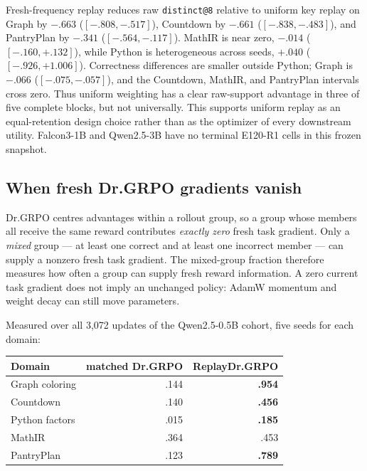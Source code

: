 Fresh-frequency replay reduces raw \texttt{distinct@8} relative to uniform key
replay on Graph by \(-.663\) (\([-.808,-.517]\)), Countdown by \(-.661\)
(\([-.838,-.483]\)), and PantryPlan by \(-.341\)
(\([-.564,-.117]\)). MathIR is near zero, \(-.014\)
(\([-.160,+.132]\)), while Python is heterogeneous across seeds, \(+.040\)
(\([-.926,+1.006]\)). Correctness differences are smaller outside Python;
Graph is \(-.066\) (\([-.075,-.057]\)), and the Countdown, MathIR, and
PantryPlan intervals cross zero. Thus uniform weighting has a clear raw-support
advantage in three of five complete blocks, but not universally. This supports
uniform replay as an equal-retention design choice rather than as the optimizer
of every downstream utility. Falcon3-1B and Qwen2.5-3B have no terminal E120-R1
cells in this frozen snapshot.

\subsection{When fresh Dr.GRPO gradients vanish}
\label{app:degenerate-groups}

Dr.GRPO centres advantages within a rollout group, so a group whose members all
receive the same reward contributes \emph{exactly zero} fresh task gradient.
Only a \emph{mixed} group --- at least one correct and at least one incorrect
member --- can supply a nonzero fresh task gradient. The mixed-group fraction
therefore measures how often a group can supply fresh reward information.
A zero current task gradient does not imply an unchanged policy: AdamW momentum
and weight decay can still move parameters.

Measured over all 3{,}072 updates of the Qwen2.5-0.5B cohort, five seeds
for each domain:

\begin{center}
\small
\begin{tabular}{@{}lrr@{}}
\toprule
\textbf{Domain} & \textbf{matched Dr.GRPO} & \textbf{ReplayDr.GRPO} \\
\midrule
Graph coloring & .144 & \textbf{.954} \\
Countdown      & .140 & \textbf{.456} \\
Python factors & .015 & \textbf{.185} \\
MathIR         & .364 & .453 \\
PantryPlan     & .123 & \textbf{.789} \\
\bottomrule
\end{tabular}
\end{center}

